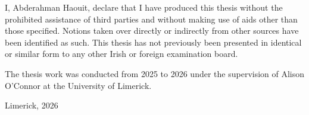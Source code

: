


\begin{declaration}        %

I, Abderahman Haouit, declare that I have produced this thesis without the prohibited assistance of third parties and without making use of aids other than those specified. Notions taken over directly or indirectly from other sources have been identified as such. This thesis has not previously been presented in identical or similar form to any other Irish or foreign examination board.

The thesis work was conducted from 2025 to 2026 under the supervision of Alison O'Connor at the University of Limerick.

\vspace{10mm}

Limerick, 2026


\end{declaration}


